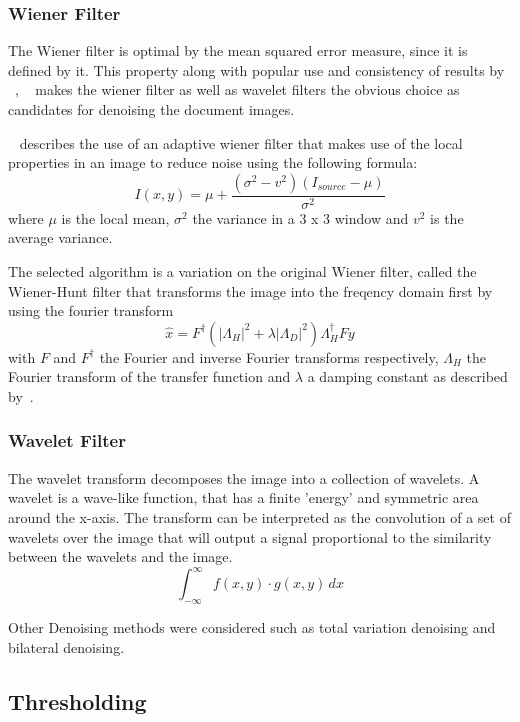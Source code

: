 \documentclass[a4paper, 12pt]{report}
\begin{document}
\subsubsection{Wiener Filter}
The Wiener filter is optimal by the mean squared error measure, since it is defined by it. This property along with popular use and consistency of results by ~\cite{6524379}, ~\cite{gatos2006adaptive} makes the wiener filter as well as wavelet filters the obvious choice as candidates for denoising the document images.
\par
~\cite{gatos2006adaptive} describes the use of an adaptive wiener filter that makes use of the local properties in an image to reduce noise using the following formula:
\[I(x,y)=\mu+\frac{(\sigma^2-v^2)(I_{source}-\mu)}{\sigma^2}\]
where \(\mu\) is the local mean, \(\sigma^2\) the variance in a 3 x 3 window and \(v^2\) is the average variance.
\par
The selected algorithm is a variation on the original Wiener filter, called the Wiener-Hunt filter that transforms the image into the freqency domain first by using the fourier transform
\[\hat x = F^\dagger (|\Lambda_H|^2 + \lambda |\Lambda_D|^2)
    \Lambda_H^\dagger F y\]
with \(F\) and \(F^\dagger\) the Fourier and inverse Fourier transforms respectively, \(\Lambda_H\) the Fourier transform of the transfer function and \(\lambda\) a damping constant as described by~\cite{scikit-image}.

\subsubsection{Wavelet Filter}
The wavelet transform decomposes the image into a collection of wavelets. A wavelet is a wave-like function, that has a finite 'energy' and symmetric area around the x-axis. The transform can be interpreted as the convolution of a set of wavelets over the image that will output a signal proportional to the similarity between the wavelets and the image.
\[ \int_{-\infty}^{\infty} f(x,y) \cdot g(x,y) \,dx \]

\par
Other Denoising methods were considered such as total variation denoising and bilateral denoising.

\subsection{Thresholding}
\end{document}
